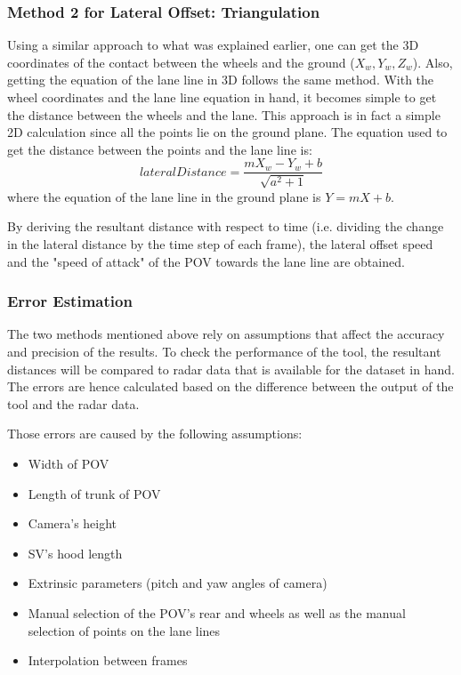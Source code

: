 \subsubsection{Method 2 for Lateral Offset: Triangulation}
Using a similar approach to what was explained earlier, one can get the 3D coordinates of the contact between the wheels and the ground ($X_w,Y_w,Z_w$). Also, getting the equation of the lane line in 3D follows the same method. With the wheel coordinates and the lane line equation in hand, it becomes simple to get the distance between the wheels and the lane. This approach is in fact a simple 2D calculation since all the points lie on the ground plane. The equation used to get the distance between the points and the lane line is:
\begin{equation}
    lateralDistance = \frac{m X_w - Y_w + b}{\sqrt{a^2+1}}
\end{equation}
where the equation of the lane line in the ground plane is $Y = mX+b$.

By deriving the resultant distance with respect to time (i.e. dividing the change in the lateral distance by the time step of each frame), the lateral offset speed and the "speed of attack" of the POV towards the lane line are obtained.

\subsubsection{Error Estimation}
The two methods mentioned above rely on assumptions that affect the accuracy and precision of the results. To check the performance of the tool, the resultant distances will be compared to radar data that is available for the dataset in hand. The errors are hence calculated based on the difference between the output of the tool and the radar data.

Those errors are caused by the following assumptions:
\begin{itemize}
    \item Width of POV
    \item Length of trunk of POV
    \item Camera's height
    \item SV's hood length
    \item Extrinsic parameters (pitch and yaw angles of camera)
    \item Manual selection of the POV's rear and wheels as well as the manual selection of points on the lane lines
    \item Interpolation between frames
\end{itemize}


